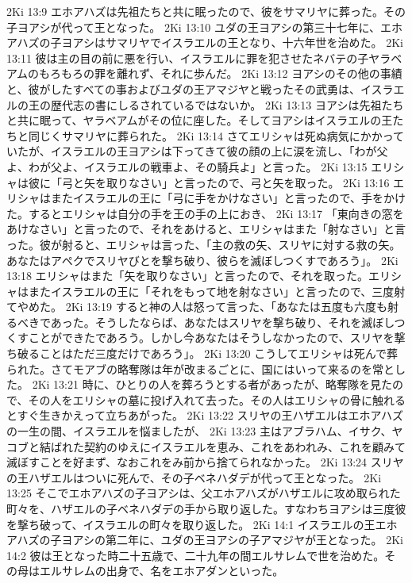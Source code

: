 2Ki 13:9  エホアハズは先祖たちと共に眠ったので、彼をサマリヤに葬った。その子ヨアシが代って王となった。
2Ki 13:10  ユダの王ヨアシの第三十七年に、エホアハズの子ヨアシはサマリヤでイスラエルの王となり、十六年世を治めた。
2Ki 13:11  彼は主の目の前に悪を行い、イスラエルに罪を犯させたネバテの子ヤラベアムのもろもろの罪を離れず、それに歩んだ。
2Ki 13:12  ヨアシのその他の事績と、彼がしたすべての事およびユダの王アマジヤと戦ったその武勇は、イスラエルの王の歴代志の書にしるされているではないか。
2Ki 13:13  ヨアシは先祖たちと共に眠って、ヤラベアムがその位に座した。そしてヨアシはイスラエルの王たちと同じくサマリヤに葬られた。
2Ki 13:14  さてエリシャは死ぬ病気にかかっていたが、イスラエルの王ヨアシは下ってきて彼の顔の上に涙を流し、「わが父よ、わが父よ、イスラエルの戦車よ、その騎兵よ」と言った。
2Ki 13:15  エリシャは彼に「弓と矢を取りなさい」と言ったので、弓と矢を取った。
2Ki 13:16  エリシャはまたイスラエルの王に「弓に手をかけなさい」と言ったので、手をかけた。するとエリシャは自分の手を王の手の上におき、
2Ki 13:17  「東向きの窓をあけなさい」と言ったので、それをあけると、エリシャはまた「射なさい」と言った。彼が射ると、エリシャは言った、「主の救の矢、スリヤに対する救の矢。あなたはアペクでスリヤびとを撃ち破り、彼らを滅ぼしつくすであろう」。
2Ki 13:18  エリシャはまた「矢を取りなさい」と言ったので、それを取った。エリシャはまたイスラエルの王に「それをもって地を射なさい」と言ったので、三度射てやめた。
2Ki 13:19  すると神の人は怒って言った、「あなたは五度も六度も射るべきであった。そうしたならば、あなたはスリヤを撃ち破り、それを滅ぼしつくすことができたであろう。しかし今あなたはそうしなかったので、スリヤを撃ち破ることはただ三度だけであろう」。
2Ki 13:20  こうしてエリシャは死んで葬られた。さてモアブの略奪隊は年が改まるごとに、国にはいって来るのを常とした。
2Ki 13:21  時に、ひとりの人を葬ろうとする者があったが、略奪隊を見たので、その人をエリシャの墓に投げ入れて去った。その人はエリシャの骨に触れるとすぐ生きかえって立ちあがった。
2Ki 13:22  スリヤの王ハザエルはエホアハズの一生の間、イスラエルを悩ましたが、
2Ki 13:23  主はアブラハム、イサク、ヤコブと結ばれた契約のゆえにイスラエルを恵み、これをあわれみ、これを顧みて滅ぼすことを好まず、なおこれをみ前から捨てられなかった。
2Ki 13:24  スリヤの王ハザエルはついに死んで、その子ベネハダデが代って王となった。
2Ki 13:25  そこでエホアハズの子ヨアシは、父エホアハズがハザエルに攻め取られた町々を、ハザエルの子ベネハダデの手から取り返した。すなわちヨアシは三度彼を撃ち破って、イスラエルの町々を取り返した。
2Ki 14:1  イスラエルの王エホアハズの子ヨアシの第二年に、ユダの王ヨアシの子アマジヤが王となった。
2Ki 14:2  彼は王となった時二十五歳で、二十九年の間エルサレムで世を治めた。その母はエルサレムの出身で、名をエホアダンといった。
